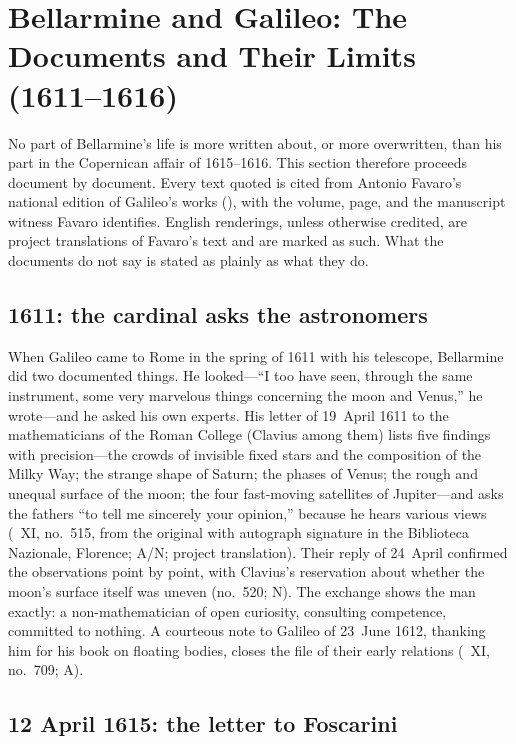 \section{Bellarmine and Galileo: The Documents and Their Limits
(1611--1616)}
\label{sec:galileo}

No part of Bellarmine's life is more written about, or more
overwritten, than his part in the Copernican affair of 1615--1616.
This section therefore proceeds document by document. Every text
quoted is cited from Antonio Favaro's national edition of Galileo's
works (),
with the volume, page, and the manuscript witness Favaro identifies.
English renderings, unless otherwise credited, are project
translations of Favaro's text and are marked as such. What the
documents do not say is stated as plainly as what they do.

\subsection{1611: the cardinal asks the astronomers}

When Galileo came to Rome in the spring of 1611 with his telescope,
Bellarmine did two documented things. He looked---``I too have
seen, through the same instrument, some very marvelous things
concerning the moon and Venus,'' he wrote---and he asked his own
experts. His letter of 19~April 1611 to the mathematicians of the
Roman College (Clavius among them) lists five findings with
precision---the crowds of invisible fixed stars and the composition
of the Milky Way; the strange shape of Saturn; the phases of Venus;
the rough and unequal surface of the moon; the four fast-moving
satellites of Jupiter---and asks the fathers ``to tell me sincerely
your opinion,'' because he hears various views (~XI,
no.~515, from the original with autograph signature in the
Biblioteca Nazionale, Florence; A/N; project translation). Their
reply of 24~April confirmed the observations point by point, with
Clavius's reservation about whether the moon's surface itself was
uneven (no.~520; N). The exchange shows the man exactly: a
non-mathematician of open curiosity, consulting competence,
committed to nothing. A courteous note to Galileo of 23~June 1612,
thanking him for his book on floating bodies, closes the file of
their early relations (~XI, no.~709; A).

\subsection{12 April 1615: the letter to Foscarini}

